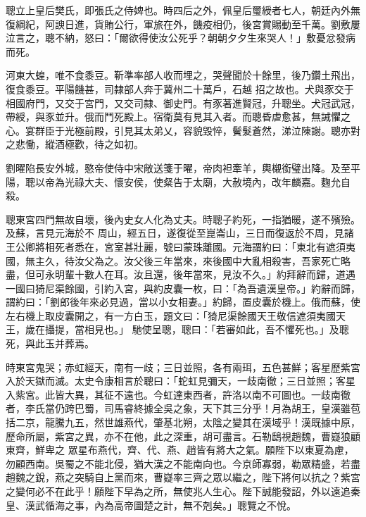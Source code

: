 \begin{pinyinscope}
 聰立上皇后樊氏，即張氏之侍婢也。時四后之外，佩皇后璽綬者七人，朝廷內外無復綱紀，阿諛日進，貨賄公行，軍旅在外，饑疫相仍，後宮賞賜動至千萬。劉敷屢泣言之，聰不納，怒曰：「爾欲得使汝公死乎？朝朝夕夕生來哭人！」敷憂忿發病而死。



 河東大蝗，唯不食黍豆。靳準率部人收而埋之，哭聲聞於十餘里，後乃鑽土飛出，復食黍豆。平陽饑甚，司隸部人奔于冀州二十萬戶，石越
 招之故也。犬與豕交于相國府門，又交于宮門，又交司隸、御史門。有豕著進賢冠，升聰坐。犬冠武冠，帶綬，與豕並升。俄而鬥死殿上。宿衛莫有見其入者。而聰昏虐愈甚，無誡懼之心。宴群臣于光極前殿，引見其太弟乂，容貌毀悴，鬢髮蒼然，涕泣陳謝。聰亦對之悲慟，縱酒極歡，待之如初。



 劉曜陷長安外城，愍帝使侍中宋敞送箋于曜，帝肉袒牽羊，輿櫬銜璧出降。及至平陽，聰以帝為光祿大夫、懷安侯，使粲告于太廟，大赦境內，改年麟嘉。麴允自殺。



 聰東宮四門無故自壞，後內史女人化為丈夫。時聰子約死，一指猶暖，遂不殯殮。及蘇，言見元海於不
 周山，經五日，遂復從至崑崙山，三日而復返於不周，見諸王公卿將相死者悉在，宮室甚壯麗，號曰蒙珠離國。元海謂約曰：「東北有遮須夷國，無主久，待汝父為之。汝父後三年當來，來後國中大亂相殺害，吾家死亡略盡，但可永明輩十數人在耳。汝且還，後年當來，見汝不久。」約拜辭而歸，道遇一國曰猗尼渠餘國，引約入宮，與約皮囊一枚，曰：「為吾遺漢皇帝。」約辭而歸，謂約曰：「劉郎後年來必見過，當以小女相妻。」約歸，置皮囊於機上。俄而蘇，使左右機上取皮囊開之，有一方白玉，題文曰：「猗尼渠餘國天王敬信遮須夷國天王，歲在攝提，當相見也。」
 馳使呈聰，聰曰：「若審如此，吾不懼死也。」及聰死，與此玉并葬焉。



 時東宮鬼哭；赤虹經天，南有一歧；三日並照，各有兩珥，五色甚鮮；客星歷紫宮入於天獄而滅。太史令康相言於聰曰：「蛇虹見彌天，一歧南徹；三日並照；客星入紫宮。此皆大異，其征不遠也。今虹達東西者，許洛以南不可圖也。一歧南徹者，李氏當仍跨巴蜀，司馬睿終據全吳之象，天下其三分乎！月為胡王，皇漢雖苞括二京，龍騰九五，然世雄燕代，肇基北朔，太陰之變其在漢域乎！漢既據中原，歷命所屬，紫宮之異，亦不在他，此之深重，胡可盡言。石勒鴟視趙魏，曹嶷狼顧東齊，鮮卑之
 眾星布燕代，齊、代、燕、趙皆有將大之氣。願陛下以東夏為慮，勿顧西南。吳蜀之不能北侵，猶大漢之不能南向也。今京師寡弱，勒眾精盛，若盡趙魏之銳，燕之突騎自上黨而來，曹嶷率三齊之眾以繼之，陛下將何以抗之？紫宮之變何必不在此乎！願陛下早為之所，無使兆人生心。陛下誠能發詔，外以遠追秦皇、漢武循海之事，內為高帝圖楚之計，無不剋矣。」聰覽之不悅。




\end{pinyinscope}
